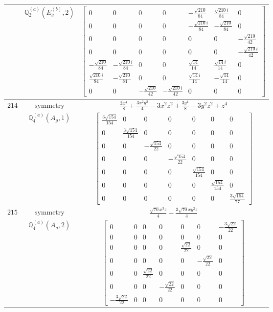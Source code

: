 \documentclass[fleqn,8pt,landscape]{jsarticle}
\begin{document}
\begin{longtable}{ccc}
$  $ & $ \mathbb{Q}_{2}^{(a)}(E_{g}^{(b)},2) $ & $ \begin{bmatrix} 0 & 0 & 0 & 0 & - \frac{\sqrt{210}}{84} & \frac{\sqrt{210} i}{84} & 0 \\ 0 & 0 & 0 & 0 & - \frac{\sqrt{210} i}{84} & - \frac{\sqrt{210}}{84} & 0 \\ 0 & 0 & 0 & 0 & 0 & 0 & - \frac{\sqrt{210}}{42} \\ 0 & 0 & 0 & 0 & 0 & 0 & - \frac{\sqrt{210} i}{42} \\ - \frac{\sqrt{210}}{84} & - \frac{\sqrt{210} i}{84} & 0 & 0 & \frac{\sqrt{14}}{14} & \frac{\sqrt{14} i}{14} & 0 \\ \frac{\sqrt{210} i}{84} & - \frac{\sqrt{210}}{84} & 0 & 0 & \frac{\sqrt{14} i}{14} & - \frac{\sqrt{14}}{14} & 0 \\ 0 & 0 & - \frac{\sqrt{210}}{42} & - \frac{\sqrt{210} i}{42} & 0 & 0 & 0 \end{bmatrix} $ \\ \hline
$ 214 $ & $ \text{symmetry} $ & $ \frac{3 x^{4}}{8} + \frac{3 x^{2} y^{2}}{4} - 3 x^{2} z^{2} + \frac{3 y^{4}}{8} - 3 y^{2} z^{2} + z^{4} $ \\
$  $ & $ \mathbb{Q}_{4}^{(a)}(A_{g},1) $ & $ \begin{bmatrix} \frac{3 \sqrt{154}}{154} & 0 & 0 & 0 & 0 & 0 & 0 \\ 0 & \frac{3 \sqrt{154}}{154} & 0 & 0 & 0 & 0 & 0 \\ 0 & 0 & - \frac{\sqrt{154}}{22} & 0 & 0 & 0 & 0 \\ 0 & 0 & 0 & - \frac{\sqrt{154}}{22} & 0 & 0 & 0 \\ 0 & 0 & 0 & 0 & \frac{\sqrt{154}}{154} & 0 & 0 \\ 0 & 0 & 0 & 0 & 0 & \frac{\sqrt{154}}{154} & 0 \\ 0 & 0 & 0 & 0 & 0 & 0 & \frac{3 \sqrt{154}}{77} \end{bmatrix} $ \\ \hline
$ 215 $ & $ \text{symmetry} $ & $ \frac{\sqrt{70} x^{3} z}{4} - \frac{3 \sqrt{70} x y^{2} z}{4} $ \\
$  $ & $ \mathbb{Q}_{4}^{(a)}(A_{g},2) $ & $ \begin{bmatrix} 0 & 0 & 0 & 0 & 0 & 0 & - \frac{3 \sqrt{22}}{22} \\ 0 & 0 & 0 & 0 & 0 & 0 & 0 \\ 0 & 0 & 0 & 0 & \frac{\sqrt{22}}{22} & 0 & 0 \\ 0 & 0 & 0 & 0 & 0 & - \frac{\sqrt{22}}{22} & 0 \\ 0 & 0 & \frac{\sqrt{22}}{22} & 0 & 0 & 0 & 0 \\ 0 & 0 & 0 & - \frac{\sqrt{22}}{22} & 0 & 0 & 0 \\ - \frac{3 \sqrt{22}}{22} & 0 & 0 & 0 & 0 & 0 & 0 \end{bmatrix} $ \\ \hline

\end{longtable}
\end{document}
